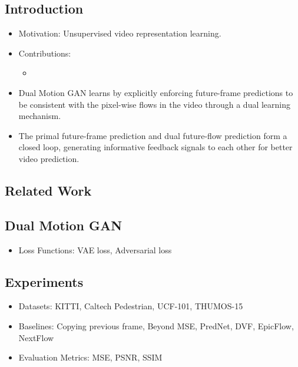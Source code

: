\documentclass{article}
\begin{document}
    \subsection{Introduction}\label{subsec:Dual_Motion_GAN_for_Future_Flow_Embedded_Video_Prediction:introduction}
    \begin{itemize}
        \item Motivation: Unsupervised video representation learning.
        \item Contributions:
        \begin{itemize}
            \item
        \end{itemize}
        \item Dual Motion GAN learns by explicitly enforcing future-frame predictions to be consistent with the pixel-wise flows in the video through a dual learning mechanism.
        \item The primal future-frame prediction and dual future-flow prediction form a closed loop, generating informative feedback signals to each other for better video prediction.
    \end{itemize}

    \subsection{Related Work}\label{subsec:Dual_Motion_GAN_for_Future_Flow_Embedded_Video_Prediction:related-work}

    \subsection{Dual Motion GAN}\label{subsec:Dual_Motion_GAN_for_Future_Flow_Embedded_Video_Prediction:dual-motion-gan}
    \begin{itemize}
        \item Loss Functions: VAE loss, Adversarial loss
    \end{itemize}

    \subsection{Experiments}\label{subsec:Dual_Motion_GAN_for_Future_Flow_Embedded_Video_Prediction:experiments}
    \begin{itemize}
        \item Datasets: KITTI, Caltech Pedestrian, UCF-101, THUMOS-15
        \item Baselines: Copying previous frame, Beyond MSE, PredNet, DVF, EpicFlow, NextFlow
        \item Evaluation Metrics: MSE, PSNR, SSIM
    \end{itemize}
    \newpage
\end{document}

